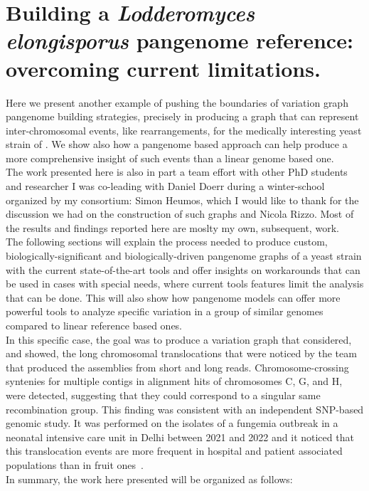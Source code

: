 \section{Building a \emph{Lodderomyces elongisporus} pangenome reference: overcoming current limitations.}
Here we present another example of pushing the boundaries of variation graph pangenome building strategies, precisely in producing a graph that can represent inter-chromosomal events, like rearrangements, for the medically interesting yeast strain of \lodelo. We show also how a pangenome based approach can help produce a more comprehensive insight of such events than a linear genome based one.\\
The work presented here is also in part a team effort with other PhD students and researcher I was co-leading with Daniel Doerr during a winter-school organized by my consortium: Simon Heumos, which I would like to thank for the discussion we had on the construction of such graphs and Nicola Rizzo. Most of the results and findings reported here are moslty my own, subsequent, work.\\
The following sections will explain the process needed to produce custom, biologically-significant and biologically-driven pangenome graphs of a yeast strain with the current state-of-the-art tools and offer insights on workarounds that can be used in cases with special needs, where current tools features limit the analysis that can be done. This will also show how pangenome models can offer more powerful tools to analyze specific variation in a group of similar genomes compared to linear reference based ones.\\ 
In this specific case, the goal was to produce a variation graph that considered, and showed, the long chromosomal translocations that were noticed by the team that produced the assemblies from short and long reads. Chromosome-crossing syntenies for multiple contigs in alignment hits of chromosomes C, G, and H, were detected, suggesting that they could correspond to a singular same recombination group. This finding was consistent with an independent SNP-based genomic study. It was performed on the isolates of a fungemia outbreak in a neonatal intensive care unit in Delhi between 2021 and 2022 and it noticed that this translocation events are more frequent in hospital and patient associated populations than in fruit ones~\cite{lodelo_india}. \\
In summary, the work here presented will be organized as follows:
